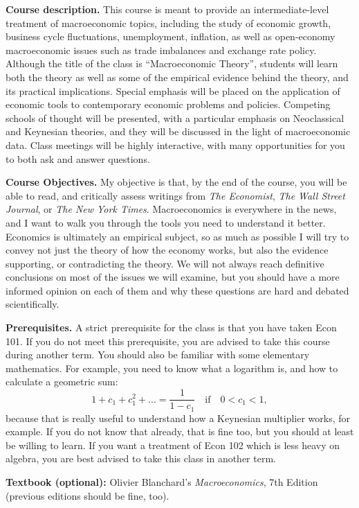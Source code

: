 \documentclass[]{book}
\begin{document}
\textbf{Course description.} This course is meant to provide an
intermediate-level treatment of macroeconomic topics, including the
study of economic growth, business cycle fluctuations, unemployment,
inflation, as well as open-economy macroeconomic issues such as trade
imbalances and exchange rate policy. Although the title of the class is
``Macroeconomic Theory'', students will learn both the theory as well as
some of the empirical evidence behind the theory, and its practical
implications. Special emphasis will be placed on the application of
economic tools to contemporary economic problems and policies. Competing
schools of thought will be presented, with a particular emphasis on
Neoclassical and Keynesian theories, and they will be discussed in the
light of macroeconomic data. Class meetings will be highly interactive,
with many opportunities for you to both ask and answer questions.

\textbf{Course Objectives.} My objective is that, by the end of the
course, you will be able to read, and critically assess writings from
\emph{The Economist}, \emph{The Wall Street Journal}, or \emph{The New
York Times}. Macroeconomics is everywhere in the news, and I want to
walk you through the tools you need to understand it better. Economics
is ultimately an empirical subject, so as much as possible I will try to
convey not just the theory of how the economy works, but also the
evidence supporting, or contradicting the theory. We will not always
reach definitive conclusions on most of the issues we will examine, but
you should have a more informed opinion on each of them and why these
questions are hard and debated scientifically.

\textbf{Prerequisites.} A strict prerequisite for the class is that you
have taken Econ 101. If you do not meet this prerequisite, you are
advised to take this course during another term. You should also be
familiar with some elementary mathematics. For example, you need to know
what a logarithm is, and how to calculate a geometric sum:
\[1+c_1+c_1^2+...=\frac{1}{1-c_1} \quad \text{if} \quad 0<c_1<1,\]
because that is really useful to understand how a Keynesian multiplier
works, for example. If you do not know that already, that is fine too,
but you should at least be willing to learn. If you want a treatment of
Econ 102 which is less heavy on algebra, you are best advised to take
this class in another term.

\textbf{Textbook (optional):} Olivier Blanchard's \emph{Macroeconomics},
7th Edition (previous editions should be fine, too).
\end{document}
